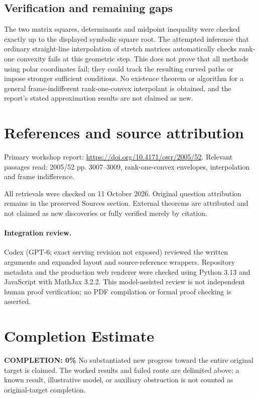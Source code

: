 \documentclass[11pt]{article}
\begin{document}
\subsection{Verification and remaining gaps}
The two matrix squares, determinants and midpoint inequality were checked exactly up to the displayed symbolic square root. The attempted inference that ordinary straight-line interpolation of stretch matrices automatically checks rank-one convexity fails at this geometric step. This does not prove that all methods using polar coordinates fail; they could track the resulting curved paths or impose stronger sufficient conditions. No existence theorem or algorithm for a general frame-indifferent rank-one-convex interpolant is obtained, and the report's stated approximation results are not claimed as new.

\section{References and source attribution}
Primary workshop report: \url{https://doi.org/10.4171/owr/2005/52}. Relevant passages read: 2005/52 pp. 3007--3009, rank-one-convex envelopes, interpolation and frame indifference.

All retrievals were checked on 11 October 2026. Original question attribution remains in the preserved Sources section. External theorems are attributed and not claimed as new discoveries or fully verified merely by citation.


\paragraph{Integration review.} Codex (GPT-6; exact serving revision not exposed) reviewed the written arguments and expanded layout and source-reference wrappers. Repository metadata and the production web renderer were checked using Python 3.13 and JavaScript with MathJax 3.2.2. This model-assisted review is not independent human proof verification; no PDF compilation or formal proof checking is asserted.

\section{Completion Estimate}
\noindent\textbf{COMPLETION: 0\%}
No substantiated new progress toward the entire original target is claimed. The worked results and failed route are delimited above; a known result, illustrative model, or auxiliary obstruction is not counted as original-target completion.
\end{document}
